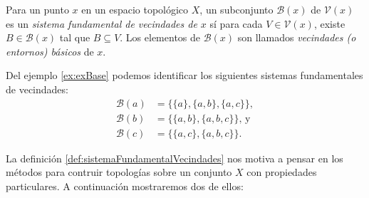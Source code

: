 \begin{definition}\label{def:sistemaFundamentalVecindades}
Para un punto $x$ en un espacio topológico $X$, un subconjunto $\mathcal{B}(x)$ de $\mathcal{V}(x)$ es un \textit{sistema fundamental de vecindades de $x$} sí para cada $V\in\mathcal{V}(x)$, existe $B\in\mathcal{B}(x)$ tal que $B\subseteq V$. Los elementos de $\mathcal{B}(x)$ son llamados \textit{vecindades (o entornos) básicos} de $x$.
\end{definition}

\begin{example}\label{ex:sistemaFundamentalVecindades}
Del ejemplo \ref{ex:exBase} podemos identificar los siguientes sistemas fundamentales de vecindades:
\begin{align*}
    \mathcal{B}(a) &= \{\{a\},\{a,b\},\{a,c\}\},\\
    \mathcal{B}(b) &= \{\{a,b\},\{a,b,c\}\}\text{, y }\\
    \mathcal{B}(c) &= \{\{a,c\},\{a,b,c\}\}.
\end{align*}
\end{example}

La definición \ref{def:sistemaFundamentalVecindades} nos motiva a pensar en los métodos para contruir topologías sobre un conjunto $X$ con propiedades particulares. A continuación mostraremos dos de ellos:

